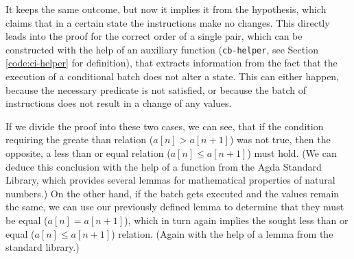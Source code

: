 It keeps the same outcome, but now it implies it from the hypothesis, which claims that in a certain state the instructions make no changes. This directly leads into the proof for the correct order of a single pair, which can be constructed with the help of an auxiliary function (\verb|cb-helper|, see Section \ref{code:ci-helper} for definition), that extracts information from the fact that the execution of a conditional batch does not alter a state. This can either happen, because the necessary predicate is not satisfied, or because the batch of instructions does not result in a change of any values.

If we divide the proof into these two cases, we can see, that if the condition requiring the greate than relation ($a[n] > a[n + 1]$) was not true, then the opposite, a less than or equal relation ($a[n] \leq a[n + 1]$) must hold. (We can deduce this conclusion with the help of a function from the Agda Standard Library\cite{agda-stdlib}, which provides several lemmas for mathematical properties of natural numbers.) On the other hand, if the batch gets executed and the values remain the same, we can use our previously defined lemma to determine that they must be equal ($a[n] = a[n + 1]$), which in turn again implies the sought less than or equal ($a[n] \leq a[n + 1]$) relation. (Again with the help of a lemma from the standard library.)

